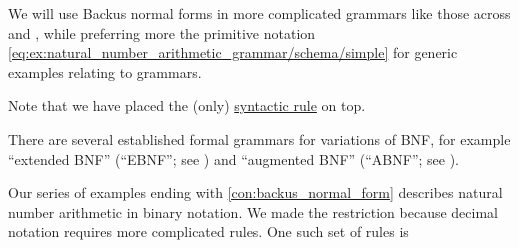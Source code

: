 \begin{comments}
  \item We will use Backus normal forms in more complicated grammars like those across  and , while preferring more the primitive notation \eqref{eq:ex:natural_number_arithmetic_grammar/schema/simple} for generic examples relating to grammars.

  \item Note that we have placed the (only) \hyperref[con:abstract_syntax_tree/syntactic]{syntactic rule} on top.

  \item There are several established formal grammars for variations of BNF, for example \enquote{extended BNF} (\enquote{EBNF}; see \cite{ISO:14977:1996}) and \enquote{augmented BNF} (\enquote{ABNF}; see \cite{IETF:RFC5234}).
\end{comments}

\begin{remark}\label{rem:decimal_notation_grammar}
  Our series of examples ending with \cref{con:backus_normal_form} describes natural number arithmetic in binary notation. We made the restriction because decimal notation requires more complicated rules. One such set of rules is
  \begin{bnf*}
      { \bnfor {} \bnfor \cdots \bnfor {}} \\
              { \bnfor {}} \\
       { \bnfor {} \bnfsp {}} \\
     { \bnfor {} \bnfsp {}}
  \end{bnf*}
\end{remark}
